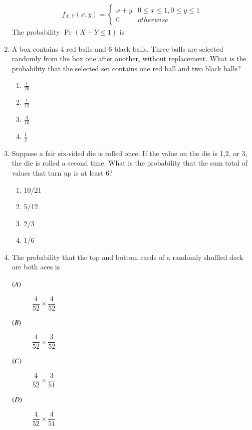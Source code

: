 \documentclass[journal,12pt,twocolumn]{IEEEtran}
\begin{document}
\begin{enumerate}
\begin{align}
 f_{X,Y}(x,y)=\begin{cases} 
      x+y & 0\leq x\leq 1, 0\leq y\leq 1 \\
      0 & otherwise
  \end{cases}
\end{align}
The probability $\Pr(X+Y\leq 1)$ is 
%
\solution

%
\item A box contains 4 red balls and 6 black balls. Three balls are selected randomly from the box one after another, 
without replacement. What is the probability that the selected set contains one red ball and two black balls?\bigskip
\begin{enumerate}\itemsep0.3cm
    \item $\displaystyle{\frac{1}{20}}$
    \item $\displaystyle{\frac{1}{12}}$
    \item $\displaystyle{\frac{3}{10}}$
    \item $\displaystyle{\frac{1}{2}}$
\end{enumerate}
%
\solution

%
\item Suppose a fair six-sided die is rolled once. If the value on the die is 1,2, or 3, the die is rolled a second time. What is the probability that the sum total of values that turn up is at least 6?
\begin{enumerate}
    \item 10/21
    \item 5/12
    \item 2/3
    \item 1/6
\end{enumerate}
%
\solution

%
\item  The probability that the top and bottom cards of a randomly shuffled deck are both aces is
\begin{description}
\item[$\left(A\right)$]$\dfrac{4}{52}\times\dfrac{4}{52}$ \\
\item[$\left(B\right)$]$\dfrac{4}{52}\times\dfrac{3}{52}$ \\
\item[$\left(C\right)$]$\dfrac{4}{52}\times\dfrac{3}{51}$ \\
\item[$\left(D\right)$]$\dfrac{4}{52}\times\dfrac{4}{51}$ \\
\end{description}
%

\end{enumerate}
\end{document}
